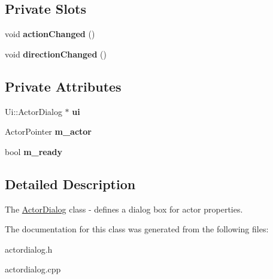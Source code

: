 \subsection*{Private Slots}
\begin{DoxyCompactItemize}
\item 
\mbox{\label{class_actor_dialog_a4100201ddb5559e23c285d2f194fcc29}} 
void {\bfseries action\+Changed} ()
\item 
\mbox{\label{class_actor_dialog_ae4e26a1a18ff4514876e524eda5434e4}} 
void {\bfseries direction\+Changed} ()
\end{DoxyCompactItemize}
\subsection*{Private Attributes}
\begin{DoxyCompactItemize}
\item 
\mbox{\label{class_actor_dialog_a3cb556b9b154afbf22c34f6ea46bce6b}} 
Ui\+::\+Actor\+Dialog $\ast$ {\bfseries ui}
\item 
\mbox{\label{class_actor_dialog_a01865fab8761795a1fcc3a92b37b53e0}} 
Actor\+Pointer {\bfseries m\+\_\+actor}
\item 
\mbox{\label{class_actor_dialog_a9742ad97f6354534e0edbcc7f34118ae}} 
bool {\bfseries m\+\_\+ready}
\end{DoxyCompactItemize}


\subsection{Detailed Description}
The \hyperlink{class_actor_dialog}{Actor\+Dialog} class -\/ defines a dialog box for actor properties. 

The documentation for this class was generated from the following files\+:\begin{DoxyCompactItemize}
\item 
actordialog.\+h\item 
actordialog.\+cpp\end{DoxyCompactItemize}
